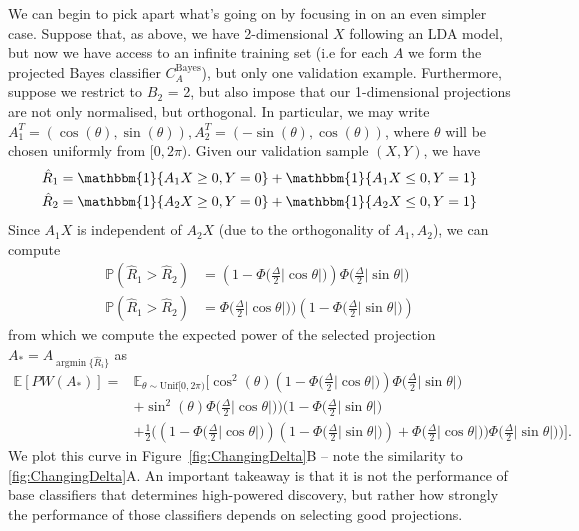 \documentclass[12pt]{article}
\DeclareMathOperator*{\argmin}{argmin}
\begin{document}
We can begin to pick apart what's going on by focusing in on an even simpler case. Suppose that, as above, we have 2-dimensional $X$ following an LDA model, but now we have access to an infinite training set (i.e for each $A$ we form the projected Bayes classifier $C_A^{\text{Bayes}}$), but only one validation example. Furthermore, suppose we restrict to $B_2$ = 2, but also impose that our 1-dimensional projections are not only normalised, but orthogonal. In particular, we may write $A_1^T = (\cos(\theta), \sin(\theta)), A_2^T = (-\sin(\theta), \cos(\theta))$, where $\theta$ will be chosen uniformly from $[0, 2\pi)$. Given our validation sample $(X, Y)$, we have
\begin{align*}
    \hat{R}_1 & = \mathbbm{1}\{ A_1X \geq 0, Y = 0 \} + \mathbbm{1}\{ A_1X \leq 0, Y = 1 \} \\
    \hat{R}_2 & = \mathbbm{1}\{ A_2X \geq 0, Y = 0 \} + \mathbbm{1}\{ A_2X \leq 0, Y = 1 \}
\end{align*}
Since $A_1X$ is independent of $A_2X$ (due to the orthogonality of $A_1, A_2$), we can compute 
\begin{align*}
    \mathbb{P}(\hat{R}_1 > \hat{R}_2) & = (1 - \Phi\big(\frac{\Delta}{2}|\cos\theta|\big))\Phi\big(\frac{\Delta}{2}|\sin\theta|\big) \\
    \mathbb{P}(\hat{R}_1 > \hat{R}_2) & = \Phi\big(\frac{\Delta}{2}|\cos\theta|\big))(1-\Phi\big(\frac{\Delta}{2}|\sin\theta|\big)) %
\end{align*}
from which we compute the expected power of the selected projection $A_* = A_{\argmin \{ \hat{R}_i\}}$ as 
\begin{align*}
\mathbb{E}[PW(A_*)] = & \mathbb{E}_{\theta \sim \text{Unif}[0, 2\pi)}[\cos^2(\theta) (1 - \Phi\big(\frac{\Delta}{2}|\cos\theta|\big))\Phi\big(\frac{\Delta}{2}|\sin\theta|\big)\\ 
 &+ \sin^2(\theta) \Phi\big(\frac{\Delta}{2}|\cos\theta|\big))(1-\Phi\big(\frac{\Delta}{2}|\sin\theta|\big) \\
 &+ \frac{1}{2} \Big( (1 - \Phi\big(\frac{\Delta}{2}|\cos\theta|\big))(1-\Phi\big(\frac{\Delta}{2}|\sin\theta|\big)) + 
    \Phi\big(\frac{\Delta}{2}|\cos\theta|\big))\Phi\big(\frac{\Delta}{2}|\sin\theta|\big) \Big)].  
    \end{align*}
We plot this curve in Figure~\ref{fig:ChangingDelta}B -- note the similarity to \ref{fig:ChangingDelta}A. An important takeaway is that it is not the performance of base classifiers that determines high-powered discovery, but rather how strongly the performance of those classifiers depends on selecting good projections.
\end{document}
